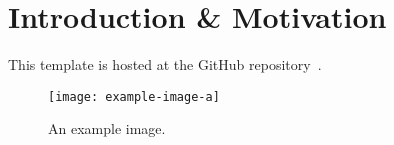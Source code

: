 
\section{Introduction \& Motivation}

This template is hosted at the GitHub repository~\cite{mizutani2021interactions-template}.

\lipsum[1]

\begin{figure}[ht!]
\texttt{[image: example-image-a]}
\caption{An example image.}
\label{fig:example}
\end{figure}

\lipsum
